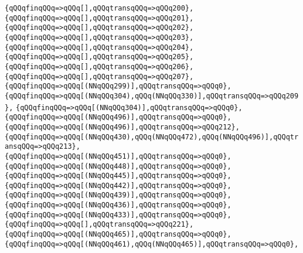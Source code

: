\verb|{qQQqfinqQQq=>qQQq[],qQQqtransqQQq=>qQQq200},|\newline
\verb|{qQQqfinqQQq=>qQQq[],qQQqtransqQQq=>qQQq201},|\newline
\verb|{qQQqfinqQQq=>qQQq[],qQQqtransqQQq=>qQQq202},|\newline
\verb|{qQQqfinqQQq=>qQQq[],qQQqtransqQQq=>qQQq203},|\newline
\verb|{qQQqfinqQQq=>qQQq[],qQQqtransqQQq=>qQQq204},|\newline
\verb|{qQQqfinqQQq=>qQQq[],qQQqtransqQQq=>qQQq205},|\newline
\verb|{qQQqfinqQQq=>qQQq[],qQQqtransqQQq=>qQQq206},|\newline
\verb|{qQQqfinqQQq=>qQQq[],qQQqtransqQQq=>qQQq207},|\newline
\verb|{qQQqfinqQQq=>qQQq[(NNqQQq299)],qQQqtransqQQq=>qQQq0},|\newline
\verb|{qQQqfinqQQq=>qQQq[(NNqQQq304),qQQq(NNqQQq330)],qQQqtransqQQq=>qQQq209},|\newline
\verb|{qQQqfinqQQq=>qQQq[(NNqQQq304)],qQQqtransqQQq=>qQQq0},|\newline
\verb|{qQQqfinqQQq=>qQQq[(NNqQQq496)],qQQqtransqQQq=>qQQq0},|\newline
\verb|{qQQqfinqQQq=>qQQq[(NNqQQq496)],qQQqtransqQQq=>qQQq212},|\newline
\verb|{qQQqfinqQQq=>qQQq[(NNqQQq430),qQQq(NNqQQq472),qQQq(NNqQQq496)],qQQqtransqQQq=>qQQq213},|\newline
\verb|{qQQqfinqQQq=>qQQq[(NNqQQq451)],qQQqtransqQQq=>qQQq0},|\newline
\verb|{qQQqfinqQQq=>qQQq[(NNqQQq448)],qQQqtransqQQq=>qQQq0},|\newline
\verb|{qQQqfinqQQq=>qQQq[(NNqQQq445)],qQQqtransqQQq=>qQQq0},|\newline
\verb|{qQQqfinqQQq=>qQQq[(NNqQQq442)],qQQqtransqQQq=>qQQq0},|\newline
\verb|{qQQqfinqQQq=>qQQq[(NNqQQq439)],qQQqtransqQQq=>qQQq0},|\newline
\verb|{qQQqfinqQQq=>qQQq[(NNqQQq436)],qQQqtransqQQq=>qQQq0},|\newline
\verb|{qQQqfinqQQq=>qQQq[(NNqQQq433)],qQQqtransqQQq=>qQQq0},|\newline
\verb|{qQQqfinqQQq=>qQQq[],qQQqtransqQQq=>qQQq221},|\newline
\verb|{qQQqfinqQQq=>qQQq[(NNqQQq465)],qQQqtransqQQq=>qQQq0},|\newline
\verb|{qQQqfinqQQq=>qQQq[(NNqQQq461),qQQq(NNqQQq465)],qQQqtransqQQq=>qQQq0},|\newline
